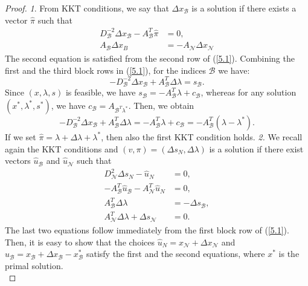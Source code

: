 \documentclass[a4paper,10 pt,titlepage,twoside]{book}
\theoremstyle{plain}
\theoremstyle{definition}
\theoremstyle{remark}
\begin{document}
\begin{proof}
	\textit{1}. From KKT conditions, we say that $\Delta x_{\mathcal{B}}$ is a solution if there exists a vector $\hat{\pi}$ such that
	\begin{align*}
	D_{\mathcal{B}}^{-2}\Delta x_{\mathcal{B}}-A_{\mathcal{B}}^{T}\hat{\pi}&= 0,\\
	A_{\mathcal{B}}\Delta x_{B}&= -A_{\mathcal{N}}\Delta x_{\mathcal{N}}
	\end{align*}
	The second equation is satisfied from the second row of (\ref{5.1}). Combining the first and the third block rows in (\ref{5.1}), for the indices $\mathcal{B}$ we have:
	\begin{equation*}
	-D_{\mathcal{B}}^{-2}\Delta x_{\mathcal{B}} + A_{\mathcal{B}}^{T}\Delta \lambda = s_{\mathcal{B}}.
	\end{equation*}
	Since $(x, \lambda, s)$ is feasible, we have $s_{\mathcal{B}}= -A_{\mathcal{B}}^{T}\lambda+ c_{\mathcal{B}}$, whereas for any solution $(x^{*}, \lambda^{*}, s^{*})$, we have $c_{\mathcal{B}}= A_{\mathcal{B}^{T}\lambda^{*}}$. Then, we obtain
	\begin{equation*}
	-D_{\mathcal{B}}^{-2}\Delta x_{\mathcal{B}} + A_{\mathcal{B}}^{T}\Delta \lambda = -A_{\mathcal{B}}^{T}\lambda+ c_{\mathcal{B}} = -A_{\mathcal{B}}^{T}(\lambda - \lambda^{*}). 
	\end{equation*}
	If we set $\hat{\pi} = \lambda + \Delta\lambda + \lambda^{*}$, then also the first KKT condition holds.\newline
	\textit{2.} We recall again the KKT conditions and $(v,\pi)=(\Delta s_{N},\Delta\lambda)$ is a solution if there exist vectors $\hat{u}_{\mathcal{B}}$ and $\hat{u}_{\mathcal{N}}$ such that
	\begin{align*}
	D_{\mathcal{N}}^{2}\Delta s_{N}-\hat{u}_{N}&=0,\\
	-A_{\mathcal{B}}^{T}\hat{u}_{\mathcal{B}}-A_{\mathcal{N}}^{T}\hat{u}_{N}&=0,\\
	A_{\mathcal{B}}^{T}\Delta \lambda &= -\Delta s_{\mathcal{B}},\\
	A_{\mathcal{N}}^{T}\Delta\lambda + \Delta s_{\mathcal{N}} &=0. 
	\end{align*}
	The last two equations follow immediately from the first block row of (\ref{5.1}).\\
	Then, it is easy to show that the choices $\hat{u}_{N}= x_{\mathcal{N}}+\Delta x_{\mathcal{N}}$ and $\hat{u}_{\mathcal{B}}=x_{\mathcal{B}}+\Delta x_{\mathcal{B}}-x_{\mathcal{B}}^{*}$ satisfy the first and the second equations, where $x^{*}$ is the primal solution.\\

\end{proof}
\end{document}
